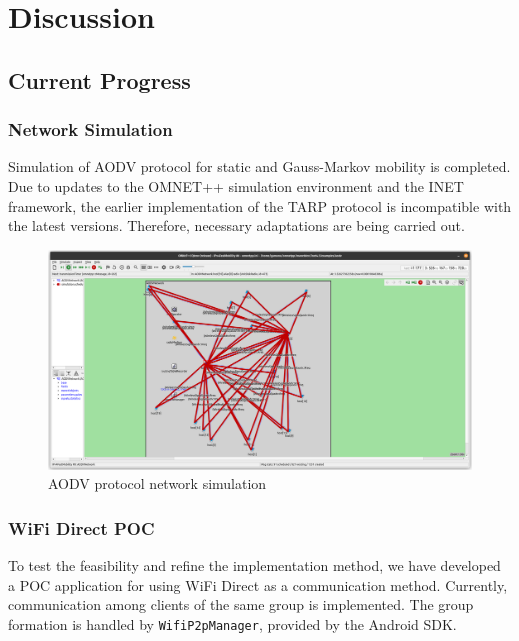 \section{Discussion}
\subsection{Current Progress}
\subsubsection{Network Simulation}

Simulation of AODV protocol for static and Gauss-Markov mobility is completed.
Due to updates to the OMNET++ simulation environment and the INET framework,
the earlier implementation of the TARP protocol is incompatible with the latest
versions. Therefore, necessary adaptations are being carried out.

\begin{figure}[htbp]
    \centerline{\includegraphics[height=0.45\textwidth]{imgs/aodvSim.png}}
    \caption{AODV protocol network simulation}
    \label{aodvSim}
\end{figure}

\subsubsection{WiFi Direct POC}

To test the feasibility and refine the implementation method, we have developed
a POC application for using WiFi Direct as a communication method. Currently,
communication among clients of the same group is implemented. The group
formation is handled by \texttt{WifiP2pManager}, provided by the Android SDK\cite{wifiman}.